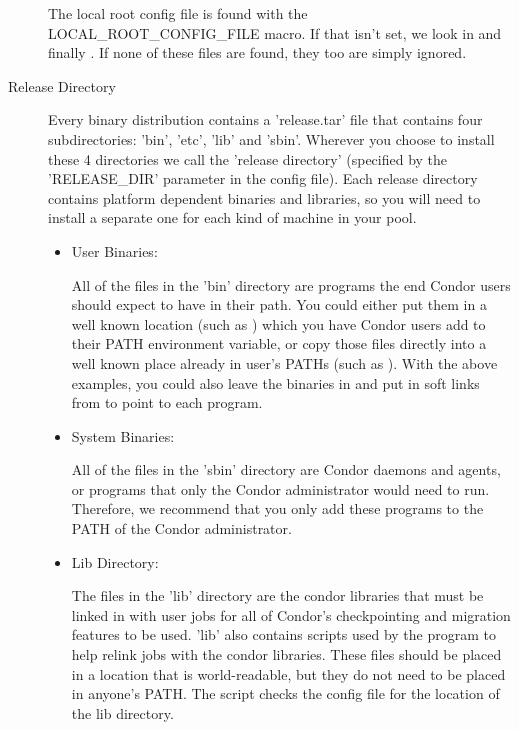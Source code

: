\begin{description}
The local root config file is found with the LOCAL\_ROOT\_CONFIG\_FILE
macro.  If that isn't set, we look in
 and finally
.  If none of these files are found,
they too are simply ignored.

\item[Release Directory]

Every binary distribution contains a 'release.tar' file that contains
four subdirectories: 'bin', 'etc', 'lib' and 'sbin'.  Wherever you
choose to install these 4 directories we call the 'release directory'
(specified by the 'RELEASE\_DIR' parameter in the config file).  Each
release directory contains platform dependent binaries and libraries,
so you will need to install a separate one for each kind of machine in
your pool.

\begin{itemize}
     \item User Binaries:

     All of the files in the 'bin' directory are programs the end
     Condor users should expect to have in their path.  You could
     either put them in a well known location (such as
     ) which you have Condor users add to their
     PATH environment variable, or copy those files directly into a
     well known place already in user's PATHs (such as
     ).  With the above examples, you could also leave
     the binaries in  and put in soft links from
      to point to each program.

     \item System Binaries:

     All of the files in the 'sbin' directory are Condor daemons and
     agents, or programs that only the Condor administrator would need
     to run.  Therefore, we recommend that you only add these programs
     to the PATH of the Condor administrator.

     \item Lib Directory:

     The files in the 'lib' directory are the condor libraries that
     must be linked in with user jobs for all of Condor's
     checkpointing and migration features to be used.  'lib' also
     contains scripts used by the  program to help
     relink jobs with the condor libraries.  These files should be
     placed in a location that is world-readable, but they do not need
     to be placed in anyone's PATH.  The  script checks
     the config file for the location of the lib directory.


\end{itemize}
\end{description}
